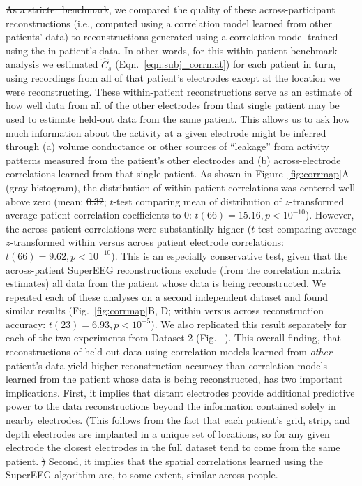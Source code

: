 \documentclass[11pt]{article}
\newcommand{\splitexpcorrmaps}{S3} %
\providecommand{\DIFaddtex}[1]{{\protect\color{blue}\uwave{#1}}} %
\providecommand{\DIFdeltex}[1]{{\protect\color{red}\sout{#1}}}                      %
\providecommand{\DIFaddbegin}{} %
\providecommand{\DIFaddend}{} %
\providecommand{\DIFdelbegin}{} %
\providecommand{\DIFdelend}{} %
\providecommand{\DIFadd}[1]{\texorpdfstring{\DIFaddtex{#1}}{#1}} %
\providecommand{\DIFdel}[1]{\texorpdfstring{\DIFdeltex{#1}}{}} %
\newcommand{\DIFscaledelfig}{0.5}
\newlength{\DIFdelgraphicswidth} %
\newlength{\DIFdelgraphicsheight} %
\newcommand{\DIFaddincludegraphics}[2][]{{\color{blue}\fbox{\DIFOincludegraphics[#1]{#2}}}} %
\newcommand{\DIFdelincludegraphics}[2][]{%
\sbox{\DIFdelgraphicsbox}{\DIFOincludegraphics[#1]{#2}}%
\settoboxwidth{\DIFdelgraphicswidth}{\DIFdelgraphicsbox} %
\settoboxtotalheight{\DIFdelgraphicsheight}{\DIFdelgraphicsbox} %
\scalebox{\DIFscaledelfig}{%
\parbox[b]{\DIFdelgraphicswidth}{\usebox{\DIFdelgraphicsbox}\\[-\baselineskip] \rule{\DIFdelgraphicswidth}{0em}}\llap{\resizebox{\DIFdelgraphicswidth}{\DIFdelgraphicsheight}{%
\setlength{\unitlength}{\DIFdelgraphicswidth}%
\begin{picture}(1,1)%
\thicklines\linethickness{2pt} %
{\color[rgb]{1,0,0}\put(0,0){\framebox(1,1){}}}%
{\color[rgb]{1,0,0}\put(0,0){\line( 1,1){1}}}%
{\color[rgb]{1,0,0}\put(0,1){\line(1,-1){1}}}%
\end{picture}%
}\hspace*{3pt}}} %
} %
\DeclareRobustCommand{\DIFaddbegin}{\DIFOaddbegin \let\includegraphics\DIFaddincludegraphics} %
\DeclareRobustCommand{\DIFaddend}{\DIFOaddend \let\includegraphics\DIFOincludegraphics} %
\DeclareRobustCommand{\DIFdelbegin}{\DIFOdelbegin \let\includegraphics\DIFdelincludegraphics} %
\DeclareRobustCommand{\DIFdelend}{\DIFOaddend \let\includegraphics\DIFOincludegraphics} %
\begin{document}
\DIFdelbegin \DIFdel{As a stricter benchmark}\DIFdelend \DIFaddbegin \DIFadd{Next}\DIFaddend , we compared the quality of these across-participant reconstructions (i.e.,
computed using a correlation model learned from other patients' data) to
reconstructions generated using a correlation model trained using the
in-patient's data.  In other words, for this within-patient benchmark analysis
we estimated $\hat{C}_{s}$ (Eqn.~\ref{eqn:subj_corrmat}) for each patient in
turn, using recordings from all of that patient's electrodes except at the
location we were reconstructing.  These within-patient reconstructions serve as
an estimate of how well data from all of the other electrodes from that single
patient may be used to estimate held-out data from the same patient.  This
allows us to ask how much information about the activity at a given electrode
might be inferred through (a) volume conductance or other sources of ``leakage''
from activity patterns measured from the patient's other electrodes and (b)
across-electrode correlations learned from that single patient.  As shown in
Figure~\ref{fig:corrmap}A (gray histogram), the distribution of within-patient
correlations was centered well above zero (mean: \DIFdelbegin \DIFdel{0.32}\DIFdelend \DIFaddbegin \DIFadd{$r = 0.32$}\DIFaddend ; $t$-test comparing
mean of distribution of $z$-transformed average patient correlation coefficients
to 0: $t(66) = 15.16, p < 10^{-10}$). However, the across-patient correlations
were substantially higher ($t$-test comparing average $z$-transformed within
versus across patient electrode correlations: \DIFdelbegin \DIFdel{$t(66) = 9.62, p < 10^{-10}$}\DIFdelend \DIFaddbegin \DIFadd{$t(66) = 9.17, p < 10^{-10}$}\DIFaddend ).
This is an especially conservative test, given that the across-patient SuperEEG
reconstructions exclude (from the correlation matrix estimates) all data from
the patient whose data is being reconstructed.  We repeated each of these
analyses on a second independent dataset and found similar results
(Fig.~\ref{fig:corrmap}B, D; within versus across reconstruction accuracy:
\DIFdelbegin \DIFdel{$t(23) = 6.93, p < 10^{-5}$}\DIFdelend \DIFaddbegin \DIFadd{$t(77) = 11.25, p < 10^{-10}$}\DIFaddend ). We also replicated this result separately for
each of the two experiments from Dataset 2 (Fig.~\DIFdelbegin %
\DIFdelend \DIFaddbegin \DIFadd{\splitexpcorrmaps}\DIFaddend ).  This overall
finding, that reconstructions of held-out data using correlation models learned
from \textit{other} patient's data yield higher reconstruction accuracy than
correlation models learned from the patient whose data is being reconstructed,
has two important implications.  First, it implies that distant electrodes
provide additional predictive power to the data reconstructions beyond the
information contained solely in nearby electrodes.  \DIFdelbegin \DIFdel{(}\DIFdelend This follows from the fact
that each patient's grid, strip, and depth electrodes are implanted in a unique
set of locations, so for any given electrode the closest electrodes in the full
dataset tend to come from the same patient.  \DIFdelbegin \DIFdel{)  }\DIFdelend Second, it implies that the
spatial correlations learned using the SuperEEG algorithm are, to some extent,
similar across people.
\end{document}
